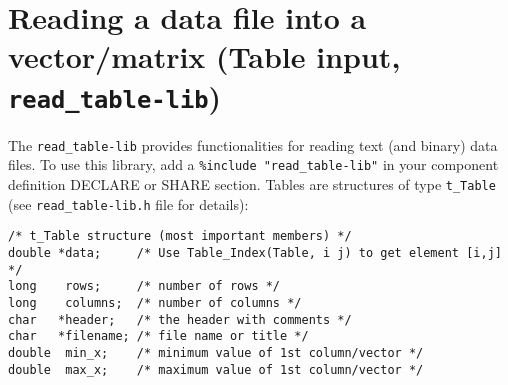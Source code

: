 \section{Reading a data file into a vector/matrix (Table input, \texttt{read\_table-lib})}
\label{s:read-table}
  The \verb+read_table-lib+ provides functionalities for reading text
  (and binary) data files. To use this library,
  add a \verb+%include "read_table-lib"+ in your component definition
  DECLARE or SHARE section. Tables are structures of type \verb+t_Table+
  (see \verb+read_table-lib.h+ file for details):
\begin{lstlisting}
/* t_Table structure (most important members) */
double *data;     /* Use Table_Index(Table, i j) to get element [i,j] */
long    rows;     /* number of rows */
long    columns;  /* number of columns */
char   *header;   /* the header with comments */
char   *filename; /* file name or title */
double  min_x;    /* minimum value of 1st column/vector */
double  max_x;    /* maximum value of 1st column/vector */
\end{lstlisting}

